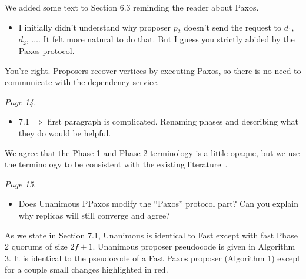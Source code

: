 \documentclass[letterpaper,twocolumn,10pt]{article}
\newenvironment{reviewerquote}
{\list{}{\leftmargin=\parindent\rightmargin=0in}\item[] \itshape \color{ReviewerDarkGray}}%
{\endlist}
\begin{document}
We added some text to Section 6.3 reminding the reader about Paxos.

\begin{reviewerquote}
  \begin{itemize}
    \item
      I initially didn't understand why proposer $p_2$ doesn't send the request
      to $d_1$, $d_2$, $\ldots$. It felt more natural to do that. But I guess
      you strictly abided by the Paxos protocol.
  \end{itemize}
\end{reviewerquote}

You're right. Proposers recover vertices by executing Paxos, so there is no
need to communicate with the dependency service.

\begin{reviewerquote}
  Page 14.

  \begin{itemize}
    \item
      7.1 $\Rightarrow$ first paragraph is complicated. Renaming phases and
      describing what they do would be helpful.
  \end{itemize}
\end{reviewerquote}

We agree that the Phase 1 and Phase 2 terminology is a little opaque, but we
use the terminology to be consistent with the existing
literature~\cite{howard2021fast}.

\begin{reviewerquote}
  Page 15.

  \begin{itemize}
    \item
      Does Unanimous PPaxos modify the ``Paxos'' protocol part? Can you explain
      why replicas will still converge and agree?
  \end{itemize}
\end{reviewerquote}

As we state in Section 7.1, Unanimous \BPaxos{} is identical to Fast \BPaxos{}
except with fast Phase 2 quorums of size $2f+1$. Unanimous \BPaxos{} proposer
pseudocode is given in Algorithm 3. It is identical to the pseudocode of a Fast
Paxos proposer (Algorithm 1) except for a couple small changes highlighted in
red.
\end{document}
